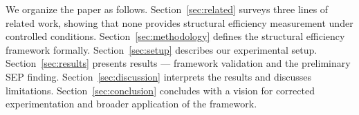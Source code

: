 We organize the paper as follows. Section~\ref{sec:related} surveys three lines of related work,
showing that none provides structural efficiency measurement under controlled
conditions. Section~\ref{sec:methodology} defines the structural efficiency framework formally.
Section~\ref{sec:setup} describes our experimental setup. Section~\ref{sec:results} presents results ---
framework validation and the preliminary SEP finding. Section~\ref{sec:discussion} interprets the
results and discusses limitations. Section~\ref{sec:conclusion} concludes with a vision for
corrected experimentation and broader application of the framework.

